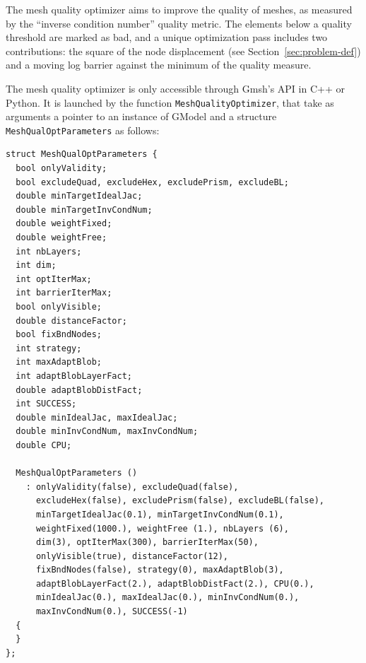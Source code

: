 \documentclass[12pt,a4paper,a4wide]{article}
\begin{document}
The mesh quality optimizer aims to improve the quality of meshes,
as measured by the ``inverse condition number'' quality metric.
The elements below a quality threshold are marked as bad, and a
unique optimization pass includes two contributions: the square
of the node displacement (see Section~\ref{sec:problem-def}) and
a moving log barrier against the minimum of the quality measure.

The mesh quality optimizer is only accessible through Gmsh's API
in C++ or Python. It is launched by the function
\texttt{MeshQualityOptimizer}, that take as arguments a pointer to
an instance of GModel and a structure \texttt{MeshQualOptParameters}
as follows:
\begin{verbatim}
struct MeshQualOptParameters {
  bool onlyValidity;
  bool excludeQuad, excludeHex, excludePrism, excludeBL;
  double minTargetIdealJac;
  double minTargetInvCondNum;
  double weightFixed;
  double weightFree;
  int nbLayers;
  int dim;
  int optIterMax;
  int barrierIterMax;
  bool onlyVisible;
  double distanceFactor;
  bool fixBndNodes;
  int strategy;
  int maxAdaptBlob;
  int adaptBlobLayerFact;
  double adaptBlobDistFact;
  int SUCCESS;
  double minIdealJac, maxIdealJac;
  double minInvCondNum, maxInvCondNum;
  double CPU;

  MeshQualOptParameters ()
    : onlyValidity(false), excludeQuad(false),
      excludeHex(false), excludePrism(false), excludeBL(false),
      minTargetIdealJac(0.1), minTargetInvCondNum(0.1),
      weightFixed(1000.), weightFree (1.), nbLayers (6),
      dim(3), optIterMax(300), barrierIterMax(50),
      onlyVisible(true), distanceFactor(12),
      fixBndNodes(false), strategy(0), maxAdaptBlob(3),
      adaptBlobLayerFact(2.), adaptBlobDistFact(2.), CPU(0.),
      minIdealJac(0.), maxIdealJac(0.), minInvCondNum(0.),
      maxInvCondNum(0.), SUCCESS(-1)
  {
  }
};
\end{verbatim}
\end{document}
